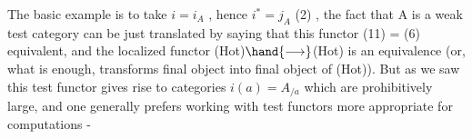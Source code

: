 The basic example is to take $i = i_{A}$ , hence $i^{*} = j_{A}$ (2) , the
 fact that A is a weak test category can be just translated  by saying
that this functor (11) = (6)   
equivalent,  and the localized functor (Hot)$\hand{\longrightarrow}$(Hot) is an
equivalence (or, what is enough, transforms final object into final
object of (Hot)). But as we saw\hand{,} this  test functor gives rise to
categories $i(a) = A_{/a}$ which are prohibitively large, and one generally
prefers working with  test functors more appropriate for computations -
